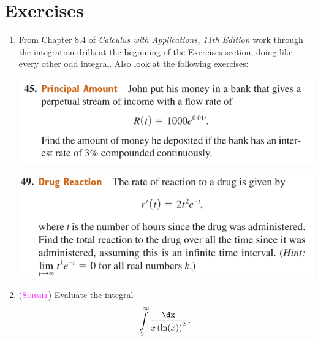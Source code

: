 \section*{Exercises}

\begin{enumerate}
    \item %
        From Chapter 8.4 of \emph{Calculus with Applications, 11th Edition}
        work through the integration drills 
        at the beginning of the Exercises section,
        doing like every other odd integral.
        Also look at the following exercises:

        \begin{center}
            \includegraphics[width=\textwidth]{screenshots/45.png}
        \end{center}

        \begin{center}
            \includegraphics[width=\textwidth]{screenshots/49.png}
        \end{center}

    \item 
        (\textsc{\textcolor{magenta}{Submit}})
        Evaluate the integral 
        \begin{equation*}
            \int\limits_2^\infty \frac{\dx}{x\left(\ln(x)\right)^2}
            \,.
        \end{equation*}


\end{enumerate}

